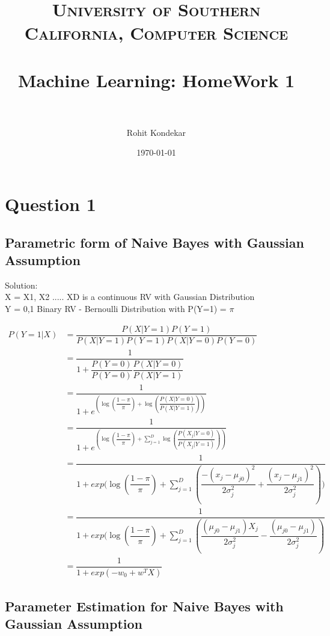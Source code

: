 \documentclass[paper=a4, fontsize=11pt]{scrartcl} %
\title{	
\normalfont \normalsize 
\textsc{University of Southern California, Computer Science} \\ [25pt] %
\horrule{0.5pt} \\[0.4cm] %
\huge Machine Learning: HomeWork 1 \\ %
\horrule{2pt} \\[0.5cm] %
}
\author{Rohit Kondekar} %
\date{\normalsize\today} %
\numberwithin{equation}{section} %
\numberwithin{figure}{section} %
\numberwithin{table}{section} %
\begin{document}
\maketitle %


\section{Question 1}
\subsection{ Parametric form of Naive Bayes with Gaussian Assumption}

\begingroup
Solution:\\
X = {X1, X2 ..... XD} is a continuous RV with Gaussian Distribution \\
Y = {0,1} Binary RV - Bernoulli Distribution with P(Y=1) = \begin{math}\pi\end{math}

\begin{align*} 
P(Y=1|X) &= \dfrac{P(X|Y=1)P(Y=1)}{P(X|Y=1)P(Y=1) P(X|Y=0)P(Y=0)}\\
&= \dfrac{1}{1+ \dfrac{P(Y=0)}{P(Y=0)}\dfrac{P(X|Y=0)}{P(X|Y=1)}}\\
&= \dfrac{1}{1+ e^{(\log(\dfrac{1-\pi}{\pi})+\log(\dfrac{P(X|Y=0)}{P(X|Y=1)}))}}\\
&= \dfrac{1}{1+ e^{(\log(\dfrac{1-\pi}{\pi})+\sum_{j=1}^{D}\log(\dfrac{P(X_{j}|Y=0)}{P(X_{j}|Y=1)}))}}\\
&= \dfrac{1}{1+ exp{(\log(\dfrac{1-\pi}{\pi})+\sum_{j=1}^{D}(\dfrac{-(x_{j}-\mu_{j0})^{2}}{2\sigma_{j}^{2}} + \dfrac{(x_{j}-\mu_{j1})^{2}}{2\sigma_{j}^{2}})})}\\
&= \dfrac{1}{1+ exp{(\log(\dfrac{1-\pi}{\pi})+\sum_{j=1}^{D}(\dfrac{(\mu_{j0} - \mu_{j1})X_{j}}{2\sigma_{j}^{2}}  -  \dfrac{(\mu_{j0} - \mu_{j1})}{2\sigma_{j}^{2}}   )}}\\
&= \dfrac{1}{1 + exp( - w_{0} + w^{T}X)}
\end{align*}
\endgroup

\subsection{ Parameter Estimation for Naive Bayes with Gaussian Assumption}
\end{document}
